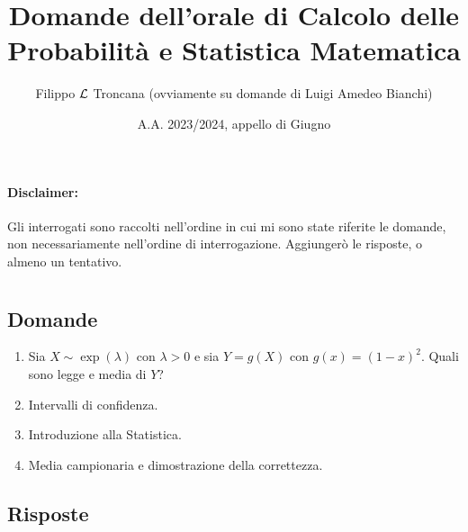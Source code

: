 \documentclass{article}
\title{Domande dell'orale di Calcolo delle Probabilità e Statistica Matematica}
\author{Filippo $\mathcal{L}$ Troncana (ovviamente su domande di Luigi Amedeo Bianchi)}
\date{A.A. 2023/2024, appello di Giugno}
\begin{document}
\maketitle

\paragraph*{Disclaimer:} Gli interrogati sono raccolti nell'ordine in cui mi sono state riferite le domande, non necessariamente nell'ordine di interrogazione. Aggiungerò le risposte, o almeno un tentativo.

\section{}%

\subsection*{Domande}

\begin{enumerate}
    \item Sia $X\sim \exp(\lambda)$ con $\lambda > 0$ e sia $Y = g(X)$ con $g(x) = (1-x)^2$. Quali sono legge e media di $Y$?
    \item Intervalli di confidenza.
    \item Introduzione alla Statistica.
    \item Media campionaria e dimostrazione della correttezza.
\end{enumerate}

\subsection*{Risposte}
\end{document}
